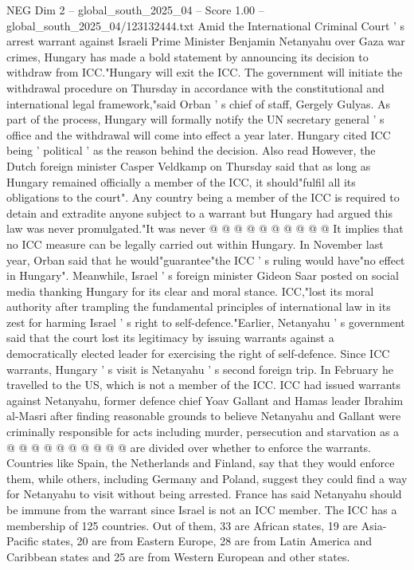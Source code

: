 \begin{textsample}{NEG Dim 2 – global\_south\_2025\_04 – Score 1.00 – global\_south\_2025\_04/123132444.txt}  \label{ex:f2_neg_096}
Amid the International Criminal Court ' s arrest warrant against Israeli Prime Minister Benjamin Netanyahu over Gaza war crimes, Hungary has made a bold statement by announcing its decision to withdraw from ICC."Hungary will exit the ICC.
The government will initiate the withdrawal procedure on Thursday in accordance with the constitutional and international legal framework,"said Orban ' s chief of staff, Gergely Gulyas.
As part of the process, Hungary will formally notify the UN secretary general ' s office and the withdrawal will come into effect a year later.
Hungary cited ICC being ' political ' as the reason behind the decision.
Also read However, the Dutch foreign minister Casper Veldkamp on Thursday said that as long as Hungary remained officially a member of the ICC, it should"fulfil all its obligations to the court".
Any country being a member of the ICC is required to detain and extradite anyone subject to a warrant but Hungary had argued this law was never promulgated."It was never @ @ @ @ @ @ @ @ @ @ It implies that no ICC measure can be legally carried out within Hungary.
In November last year, Orban said that he would"guarantee"the ICC ' s ruling would have"no effect in Hungary".
Meanwhile, Israel ' s foreign minister Gideon Saar posted on social media thanking Hungary for its clear and moral stance.
ICC,"lost its moral authority after trampling the fundamental principles of international law in its zest for harming Israel ' s right to self-defence."Earlier, Netanyahu ' s government said that the court lost its legitimacy by issuing warrants against a democratically elected leader for exercising the right of self-defence.
Since ICC warrants, Hungary ' s visit is Netanyahu ' s second foreign trip.
In February he travelled to the US, which is not a member of the ICC.
ICC had issued warrants against Netanyahu, former defence chief Yoav Gallant and Hamas leader Ibrahim al-Masri after finding reasonable grounds to believe Netanyahu and Gallant were criminally responsible for acts including murder, persecution and starvation as a @ @ @ @ @ @ @ @ @ @ are divided over whether to enforce the warrants.
Countries like Spain, the Netherlands and Finland, say that they would enforce them, while others, including Germany and Poland, suggest they could find a way for Netanyahu to visit without being arrested.
France has said Netanyahu should be immune from the warrant since Israel is not an ICC member.
The ICC has a membership of 125 countries.
Out of them, 33 are African states, 19 are Asia-Pacific states, 20 are from Eastern Europe, 28 are from Latin America and Caribbean states and 25 are from Western European and other states.

\end{textsample}
